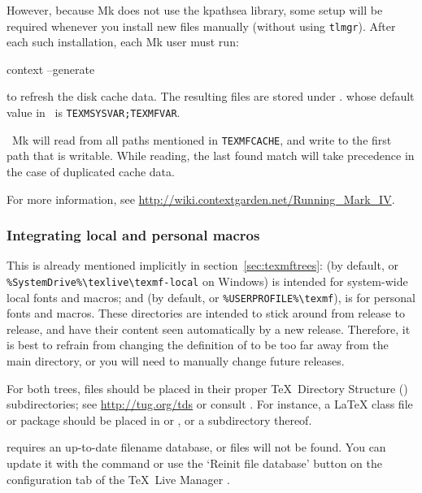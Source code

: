 \documentclass{article}
\begin{document}
However, because \ConTeXt{} Mk does not use the kpathsea
library, some setup will be required whenever you install new 
files manually (without using \verb+tlmgr+). After each such 
installation, each Mk user must run:
\begin{sverbatim}
context --generate
\end{sverbatim}
to refresh the \ConTeXt{} disk cache data.
The resulting files are stored under .
whose default value in \TL\ is \verb+TEXMSYSVAR;TEXMFVAR+. 

\ConTeXt\ Mk will read from
all paths mentioned in \verb+TEXMFCACHE+, and write to the first
path that is writable. While reading, the last found match will 
take precedence in the case of duplicated cache data.

For more information, see
\url{http://wiki.contextgarden.net/Running_Mark_IV}.


\subsubsection{Integrating local and personal macros}
\label{sec:local-personal-macros}

This is already mentioned implicitly in section~\ref{sec:texmftrees}:
 (by default,
 or
\verb|%SystemDrive%\texlive\texmf-local| on Windows)
is intended for system-wide local fonts and macros; and
 (by default,  or
\verb|%USERPROFILE%\texmf|), is for personal fonts and macros.  These
directories are intended to stick around from release to release, and
have their content seen automatically by a new \TL{} release.
Therefore, it is best to refrain from changing the definition of
 to be too far away from the main \TL{} directory,
or you will need to manually change future releases.

For both trees, files should be placed in their proper \TeX\ Directory
Structure (\TDS) subdirectories; see \url{http://tug.org/tds} or consult
. For instance, a \LaTeX{} class file or
package should be placed in  or
, or a subdirectory thereof.

 requires an up-to-date filename database, or files
will not be found.  You can update it with the command
 or use the `Reinit file database' button on the
configuration tab of the \TeX\ Live Manager \GUI.
\end{document}
